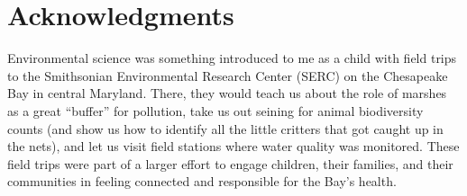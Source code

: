 \chapter*{Acknowledgments}
Environmental science was something introduced to me as a child with field trips to the Smithsonian Environmental Research Center (SERC) on the Chesapeake Bay in central Maryland. 
There, they would teach us about the role of marshes as a great ``buffer'' for pollution, take us out seining for animal biodiversity counts (and show us how to identify all the little critters that got caught up in the nets), and let us visit field stations where water quality was monitored.
These field trips were part of a larger effort to engage children, their families, and their communities in feeling connected and responsible for the Bay's health.